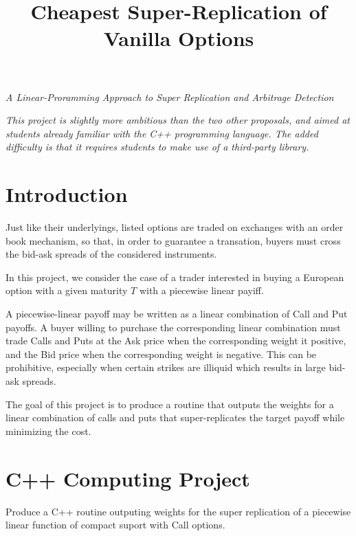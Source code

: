 \documentclass[a4paper]{article}
\author
{
}
\title{Cheapest Super-Replication of Vanilla Options}
\date{}
\newcommand{\1}{\textbf{1}}
\begin{document}
\maketitle
\vspace{-1cm}

\begin{center}{\Large \emph{A Linear-Proramming Approach to Super Replication and Arbitrage Detection} }\end{center}

\par \emph{This project is slightly more ambitious than the two other proposals, and aimed at students already familiar with the C++ programming language. The added difficulty is that it requires students to make use of a third-party library.}

\section{Introduction}

\par Just like their underlyings, listed options are traded on exchanges with an order book mechanism, so that, in order to guarantee a transation, buyers must cross the bid-ask spreads of the considered instruments.

\par In this project, we consider the case of a trader interested in buying a European option with a given maturity $T$ with a piecewise linear payiff.

\par A piecewise-linear payoff may be written as a linear combination of Call and Put payoffs. A buyer willing to purchase the corresponding linear combination must trade Calls and Puts at the Ask price when the corresponding weight it positive, and the Bid price when the corresponding weight is negative. This can be prohibitive, especially when certain strikes are illiquid which results in large bid-ask spreads.

\par The goal of this project is to produce a routine that outputs the weights for a linear combination of calls and puts that super-replicates the target payoff while minimizing the cost.

\section{C++ Computing Project}

\par Produce a C++ routine outputing weights for the super replication of a piecewise linear function of compact suport with Call options.
\end{document}
